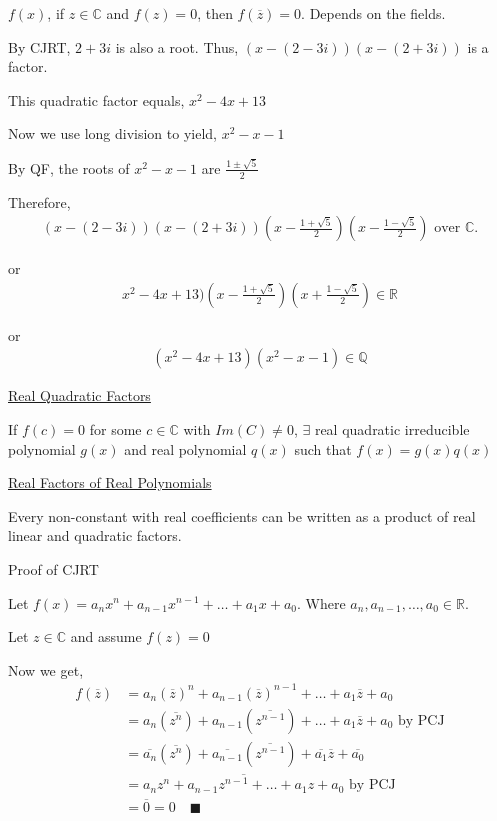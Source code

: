 \documentclass{article}
\begin{document}
$f(x)$, if $z \in \mathbb{C}$ and $f(z) = 0$, then $f(\overline{z}) = 0$. Depends on the fields.

By CJRT, $2+3i$ is also a root. Thus, $(x-(2-3i))(x-(2+3i))$ is a factor. 

This quadratic factor equals, $x^2-4x+13$

Now we use long division to yield, $x^2 - x - 1$

By QF, the roots of $x^2 - x -1$ are $\frac{1\pm \sqrt{5}}{2}$

Therefore, 
\begin{align*}
    (x-(2-3i))(x-(2+3i))(x-\frac{1+\sqrt{5}}{2})(x-\frac{1-\sqrt{5}}{2}) \text{ over } \mathbb{C}.
\end{align*}

or 
\begin{align*}
 x^2 - 4x + 13)(x - \frac{1+\sqrt{5}}{2})(x+\frac{1-\sqrt{5}}{2}) \in \mathbb{R}   
\end{align*}

or
\begin{align*}
    (x^2 - 4x + 13)(x^2 - x - 1) \in \mathbb{Q}
\end{align*}

\underline{Real Quadratic Factors}

If $f(c) = 0$ for some $c \in \mathbb{C}$ with $Im(C) \ne 0$, $\exists$ real quadratic irreducible polynomial $g(x)$ and real polynomial $q(x)$ such that $f(x) = g(x)q(x)$

\underline{Real Factors of Real Polynomials}

Every non-constant with real coefficients can be written as a product of real linear and quadratic factors.

Proof of CJRT

Let $f(x) = a_nx^n + a_{n-1}x^{n-1} + \ldots + a_1x + a_0$. Where $a_n, a_{n-1}, \ldots, a_0 \in \mathbb{R}$. 

Let $z \in \mathbb{C}$ and assume $f(z) = 0$

Now we get,
\begin{align*}
    f(\overline{z}) &= a_n(\overline{z})^n + a_{n-1}(\overline{z})^{n-1} + \ldots + a_1 \overline{z} + a_0 \\
    &= a_n(\overline{z^n})+a_{n-1}(\overline{z^{n-1}}) + \ldots + a_1 \overline{z} + a_0 \text{ by PCJ}\\
    &= \overline{a_n}(\overline{z^n}) + \overline{a_{n-1}}(\overline{z^{n-1}}) + \overline{a_1}\overline{z} + \overline{a_0} \\
    &= \overline{a_n z^n + a_{n-1}z^{n-1} + \ldots + a_1 z + a_0} \text{ by PCJ}\\
    &= \overline{0} = 0 \quad \blacksquare
\end{align*}
\end{document}
